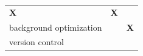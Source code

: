 \documentclass[12pt,english,a4paper,titlepage,cleardoublepage=empty,dottedtoc]{report}
\begin{document}
\begin{longtable}[]{@{}lcc@{}}
\begin{minipage}[t]{0.20\columnwidth}
\textbf{X}\strut
\end{minipage} & \begin{minipage}[t]{0.16\columnwidth}\centering\strut
\textbf{X}\strut
\end{minipage}\tabularnewline
\begin{minipage}[t]{0.32\columnwidth}\raggedright\strut
background optimization\strut
\end{minipage} & \begin{minipage}[t]{0.32\columnwidth}\centering\strut
\strut
\end{minipage} & \begin{minipage}[t]{0.32\columnwidth}\centering\strut
\textbf{X}\strut
\end{minipage}\tabularnewline
\begin{minipage}[t]{0.32\columnwidth}\raggedright\strut
version control\strut
\end{minipage} & \begin{minipage}[t]{0.32\columnwidth}\centering\strut
\strut
\end{minipage} & \begin{minipage}[t]{0.32\columnwidth}\centering\strut
\strut
\end{minipage}\tabularnewline
\bottomrule
\end{longtable}
\end{document}

